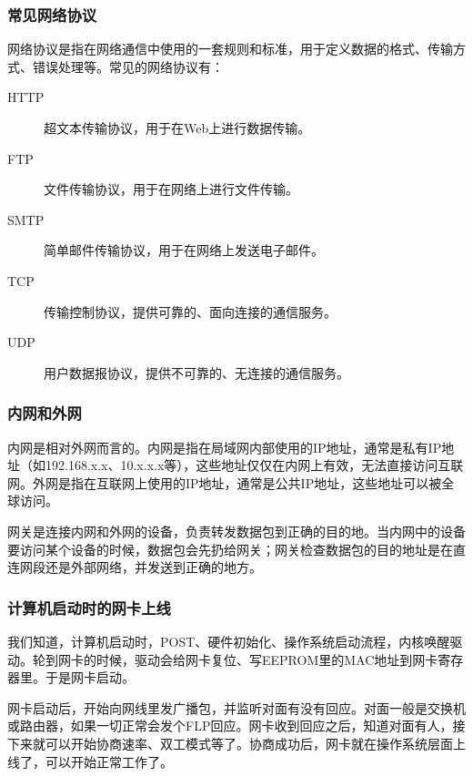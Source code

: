 \documentclass[fontset=none,aspectratio=1610]{ctexbeamer}
\begin{document}
\begin{frame}
    \frametitle{常见网络协议}

    网络协议是指在网络通信中使用的一套规则和标准，用于定义数据的格式、传输方式、错误处理等。常见的网络协议有：
    \begin{description}
        \item[HTTP] 超文本传输协议，用于在Web上进行数据传输。
        \item[FTP] 文件传输协议，用于在网络上进行文件传输。
        \item[SMTP] 简单邮件传输协议，用于在网络上发送电子邮件。
        \item[TCP] 传输控制协议，提供可靠的、面向连接的通信服务。
        \item[UDP] 用户数据报协议，提供不可靠的、无连接的通信服务。
    \end{description}

\end{frame}

\begin{frame}
    \frametitle{内网和外网}

    内网是相对外网而言的。内网是指在局域网内部使用的IP地址，通常是私有IP地址（如192.168.x.x、10.x.x.x等），这些地址仅仅在内网上有效，无法直接访问互联网。外网是指在互联网上使用的IP地址，通常是公共IP地址，这些地址可以被全球访问。

    网关是连接内网和外网的设备，负责转发数据包到正确的目的地。当内网中的设备要访问某个设备的时候，数据包会先扔给网关；网关检查数据包的目的地址是在直连网段还是外部网络，并发送到正确的地方。

\end{frame}

\begin{frame}
    \frametitle{计算机启动时的网卡上线}

    我们知道，计算机启动时，POST、硬件初始化、操作系统启动流程，内核唤醒驱动。轮到网卡的时候，驱动会给网卡复位、写EEPROM里的MAC地址到网卡寄存器里。于是网卡启动。

    网卡启动后，开始向网线里发广播包，并监听对面有没有回应。对面一般是交换机或路由器，如果一切正常会发个FLP回应。网卡收到回应之后，知道对面有人，接下来就可以开始协商速率、双工模式等了。协商成功后，网卡就在操作系统层面上线了，可以开始正常工作了。

\end{frame}
\end{document}
